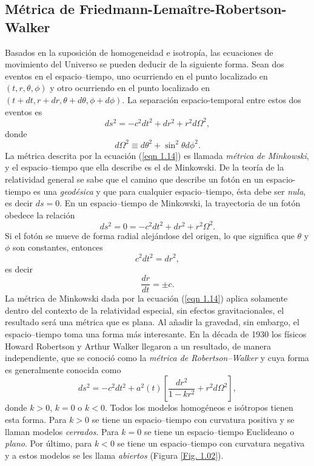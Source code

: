 \documentclass[a4paper,openright,10pt, oneside, final]{book}
\begin{document}
\subsection*{Métrica de Friedmann-Lemaître-Robertson-Walker}
Basados en la suposición de homogeneidad e isotropía, las ecuaciones de movimiento del Universo se pueden deducir de la siguiente forma. Sean dos eventos en el espacio--tiempo, uno ocurriendo en el punto localizado en $(t,r,\theta , \phi)$ y otro ocurriendo en el punto localizado en $(t +dt, r + dr, \theta + d\theta, \phi + d\phi)$. La separación espacio-temporal entre estos dos eventos es
\begin{equation}
ds^{2}=-c^{2}dt^{2} + dr^{2} +r^{2}d\Omega^{2},\label{eqn 1.14}
\end{equation}
donde
\begin{equation*}
d\Omega^{2} \equiv d\theta^{2} + \sin^{2}\theta d\phi^{2}.
\end{equation*}
La métrica descrita por la ecuación (\ref{eqn 1.14}) es llamada \textit{métrica de Minkowski}, y el espacio--tiempo que ella describe es el de Minkowski. De la teoría de la relatividad general se sabe que el camino que describe un fotón en un espacio-tiempo es una \textit{geodésica} y que para cualquier espacio--tiempo, ésta debe ser \textit{nula}, es decir $ds=0$. En un espacio--tiempo de Minkowski, la trayectoria de un fotón obedece la relación
\begin{equation}
ds^{2}=0 = -c^{2}dt^{2} + dr^{2} +r^{2}\Omega^{2}.\label{eqn 1.15}
\end{equation}
Si el fotón se mueve de forma radial alejándose del origen, lo que significa que $\theta$ y $\phi$ son constantes, entonces
\begin{equation}
c^{2}dt^{2}=dr^{2},\label{eqn 1.16}
\end{equation}
es decir
\begin{equation}
\frac{dr}{dt}=\pm c. \label{eqn 1.17}
\end{equation}
La métrica de Minkowski dada por la ecuación (\ref{eqn 1.14}) aplica solamente dentro del contexto de la relatividad especial, sin efectos gravitacionales, el resultado será una  métrica que es plana. Al añadir la gravedad, sin embargo, el espacio--tiempo toma una forma más interesante. En la década de 1930 los físicos Howard Robertson y Arthur Walker llegaron a un resultado, de manera independiente, que se conoció como la \textit{métrica de Robertson--Walker} y cuya forma es generalmente conocida como
\begin{equation}
ds^{2}
=
-c^{2}dt^{2} + a^{2}(t)
\left[
\frac{dr^{2}}{1-k r^{2}} + r^{2}d\Omega^{2}
\right],\label{eqn 1.18}
\end{equation}
donde $k > 0$, $k = 0$ o $k < 0$. Todos los modelos homogéneos e isótropos tienen esta forma. Para $k > 0$ se tiene un espacio--tiempo con curvatura positiva y se llaman modelos \textit{cerrados}. Para $k = 0$ se tiene un espacio--tiempo Euclideano o \textit{plano}. Por último, para $k < 0$ se tiene un espacio--tiempo con curvatura negativa y a estos modelos se les llama \textit{abiertos} (Figura \ref{Fig. 1.02}).
\end{document}
